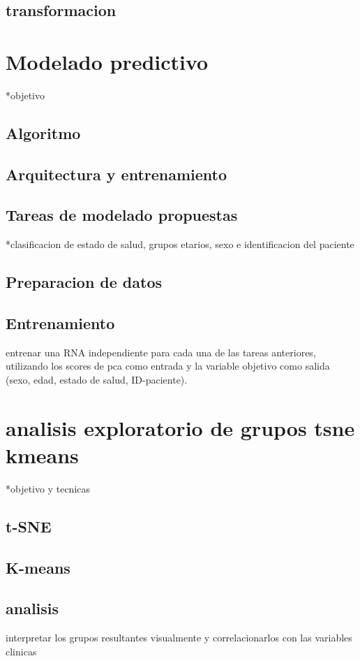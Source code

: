 \documentclass[12pt,letterpaper,oneside,openright]{book}
\begin{document}
\subsection{transformacion}


\section{Modelado predictivo}
*objetivo
\subsection{Algoritmo}
\subsection{Arquitectura y entrenamiento}
\subsection{Tareas de modelado propuestas}
*clasificacion de estado de salud, grupos etarios, sexo e identificacion del paciente
\subsection{Preparacion de datos}
\subsection{Entrenamiento} entrenar una RNA independiente para cada una de las tareas anteriores, utilizando los scores de pca como entrada y la variable objetivo como salida (sexo, edad, estado de salud, ID-paciente).


\section{analisis exploratorio de grupos tsne kmeans}
*objetivo y tecnicas
\subsection{t-SNE}
\subsection{K-means}
\subsection{analisis} interpretar los grupos resultantes visualmente y correlacionarlos con las variables clinicas
\end{document}
